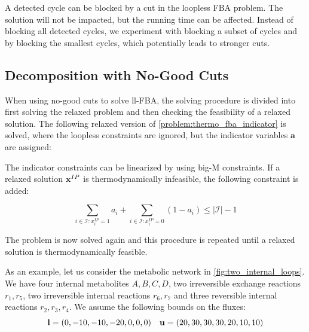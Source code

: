 A detected cycle can be blocked by a cut in the loopless FBA problem. The solution will not be impacted, but the running time can be affected. 
Instead of blocking all detected cycles, we experiment with blocking a subset of cycles and by blocking the smallest cycles, which potentially leads to stronger cuts. 

\newpage
\subsection{Decomposition with No-Good Cuts} \label{section:no_good_cuts}
When using no-good cuts to solve ll-FBA, the solving procedure is divided into first solving the relaxed problem and then checking the feasibility of a relaxed solution. 
The following relaxed version of \cref{problem:thermo_fba_indicator} is solved, where the loopless constraints are ignored, but the indicator variables $\boldsymbol a$ are assigned:
The indicator constraints can be linearized by using big-M constraints.
If a relaxed solution $\bold x^{IP}$ is thermodynamically infeasible, the following constraint is added:

\begin{equation} \label{noGoodCut}
\sum_{i \in \mathcal{I}: x_i^{IP}=1} a_i + \sum_{i \in \mathcal{I}: x_i^{IP}=0} (1-a_i) \leq |\mathcal{I}|-1
\end{equation}

The problem is now solved again and this procedure is repeated until a relaxed solution is thermodynamically feasible. 

As an example, let us consider the metabolic network in \cref{fig:two_internal_loops}. We have four internal metabolites $A,B,C, D$, two irreversible exchange reactions $r_1, r_5$, two irreversible internal reactions $ r_6, r_7$ and three reversible internal reactions $r_2, r_3, r_4$. We assume the following bounds on the fluxes: 
\begin{equation*} \label{Eq:bounds_loop}
    \bold l = (0,-10,-10,-20,0,0,0) \quad \bold u = (20,30,30,30,20,10,10)
\end{equation*}


